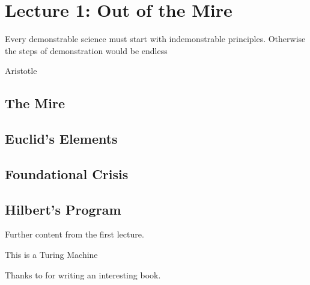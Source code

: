 \documentclass{article}
\begin{document}
\section*{Lecture 1: Out of the Mire}

\epigraph{Every demonstrable science must start with indemonstrable principles. Otherwise the steps of demonstration would be endless}{Aristotle}

\subsection*{\indent The Mire}


\subsection*{\indent Euclid's Elements}


\subsection*{\indent Foundational Crisis}

\subsection*{\indent Hilbert's Program}

\newpage

Further content from the first lecture.

\begin{defn}

This is a Turing Machine

\end{defn}

Thanks to \cite{jdhlectures} for writing an interesting book.





\printbibliography
\end{document}
